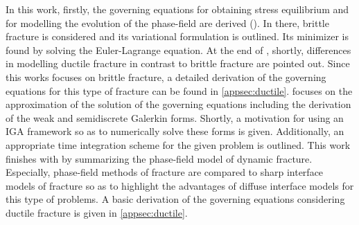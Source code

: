 In this work, firstly, the governing equations for obtaining stress equilibrium and for modelling the evolution of the phase-field are derived (). In there, brittle fracture is considered and its variational formulation is outlined. Its minimizer is found by solving the Euler-Lagrange equation. At the end of , shortly, differences in modelling ductile fracture in contrast to brittle fracture are pointed out. Since this works focuses on brittle fracture, a detailed derivation of the governing equations for this type of fracture can be found in \ref{appsec:ductile}.  focuses on the approximation of the solution of the governing equations including the derivation of the weak and semidiscrete Galerkin forms. Shortly, a motivation for using an IGA framework so as to numerically solve these forms is given. Additionally, an appropriate time integration scheme for the given problem is outlined. This work finishes with  by summarizing the phase-field model of dynamic fracture. Especially, phase-field methods of fracture are compared to sharp interface models of fracture so as to highlight the advantages of diffuse interface models for this type of problems. A basic derivation of the governing equations considering ductile fracture is given in \ref{appsec:ductile}.




